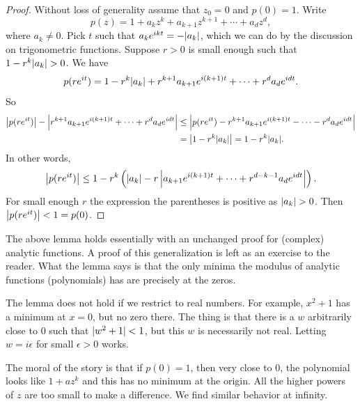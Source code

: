\begin{proof}
Without loss of generality assume that $z_0 = 0$ and $p(0) = 1$.  Write
\begin{equation*}
p(z) = 1+a_kz^k + a_{k+1}z^{k+1} + \cdots + a_d z^d ,
\end{equation*}
where $a_k \not= 0$.  Pick $t$ such that $a_k e^{ikt} = -\lvert {a_k} \rvert$, which
we can do by the discussion on trigonometric functions.  Suppose
$r > 0$ is small enough such that
$1-r^k \lvert {a_k} \rvert > 0$.  We have
\begin{equation*}
p(r e^{it}) =
1-r^k \lvert {a_k} \rvert + r^{k+1}a_{k+1}e^{i(k+1)t} + \cdots + r^{d}a_{d}e^{idt} .
\end{equation*}
So
\begin{equation*}
\begin{split}
\left\lvert {
p(r e^{it}) } \right\rvert - \left\lvert {
r^{k+1}a_{k+1}e^{i(k+1)t} + \cdots + r^{d}a_{d}e^{idt}
} \right\rvert
& \leq
\left\lvert {
p(r e^{it}) 
- r^{k+1}a_{k+1}e^{i(k+1)t} - \cdots - r^{d}a_{d}e^{idt}
} \right\rvert
\\
& =
\left\lvert {
1-r^k \lvert {a_k} \rvert
} \right\rvert
=
1-r^k \lvert {a_k} \rvert .
\end{split}
\end{equation*}
In other words,
\begin{equation*}
\left\lvert {
p(r e^{it}) } \right\rvert
\leq
1-r^k \left( \lvert {a_k} \rvert
-
r
\left\lvert {
a_{k+1}e^{i(k+1)t} + \cdots + r^{d-k-1}a_{d}e^{idt}
} \right\rvert
\right) .
\end{equation*}
For small enough $r$ the expression the parentheses is positive
as $\lvert {a_k} \rvert > 0$.  Then $\left\lvert {p(re^{it})} \right\rvert < 1 = p(0)$.
\end{proof}

\begin{remark}
The above lemma holds essentially with an unchanged proof for (complex) analytic
functions.  A proof of this generalization is left as an exercise to the reader.
What the lemma
says is that the only minima the modulus of analytic functions (polynomials)
has are precisely at the zeros.
\end{remark}

\begin{remark}
The lemma does not hold if we restrict to real numbers.  For
example, $x^2+1$ has a minimum at $x=0$, but no zero there.  The thing is that
there is a $w$ arbitrarily close to $0$ such that $\lvert {w^2+1} \rvert < 1$, but this
$w$ is necessarily not real.  Letting $w = i\epsilon$ for small
$\epsilon > 0$ works.
\end{remark}

The moral of the story is that if $p(0) = 1$, then very close to 0, the
polynomial
looks like $1+az^k$ and this has no minimum at the origin.  All the higher
powers of $z$ are too small to make a difference.  We find similar behavior
at infinity.

